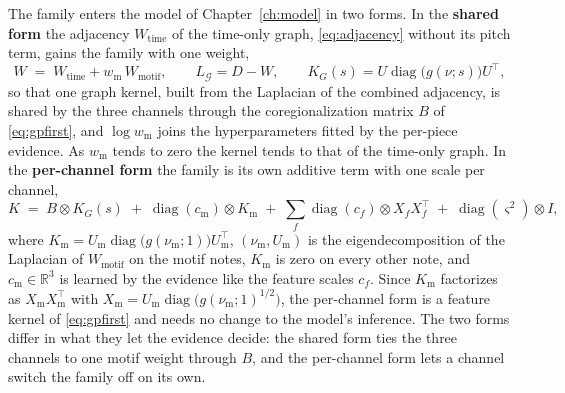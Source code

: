 \documentclass[11pt,a4paper]{report}
\newcommand{\R}{\mathbb{R}}
\newcommand{\graph}{\mathcal{G}}
\newcommand{\Lg}{L_{\graph}}
\newcommand{\diag}{\operatorname{diag}}
\begin{document}
The family enters the model of Chapter~\ref{ch:model} in two forms. In the
\textbf{shared form} the adjacency $W_{\mathrm{time}}$ of the time-only graph,
\eqref{eq:adjacency} without its pitch term, gains the family with one
weight,
\begin{equation}
  W \;=\; W_{\mathrm{time}} + w_{\mathrm m}\, W_{\mathrm{motif}},
  \qquad \Lg = D - W,
  \qquad K_G(s) = U \diag\bigl(g(\nu; s)\bigr) U^{\top},
  \label{eq:motif-shared}
\end{equation}
so that one graph kernel, built from the Laplacian of the combined
adjacency, is shared by the three channels through the coregionalization
matrix $B$ of \eqref{eq:gpfirst}, and $\log w_{\mathrm m}$ joins the
hyperparameters fitted by the per-piece evidence. As $w_{\mathrm m}$ tends
to zero the kernel tends to that of the time-only graph. In the
\textbf{per-channel form} the family is its own additive term with one
scale per channel,
\begin{equation}
  K \;=\; B \otimes K_G(s) \;+\; \diag(c_{\mathrm m}) \otimes K_{\mathrm m}
  \;+\; \sum_f \diag(c_f) \otimes X_f X_f^{\top}
  \;+\; \diag(\varsigma^2) \otimes I,
  \label{eq:motif-pc}
\end{equation}
where $K_{\mathrm m} = U_{\mathrm m} \diag\bigl(g(\nu_{\mathrm m}; 1)\bigr) U_{\mathrm m}^{\top}$,
$(\nu_{\mathrm m}, U_{\mathrm m})$ is the eigendecomposition of the
Laplacian of $W_{\mathrm{motif}}$ on the motif notes, $K_{\mathrm m}$ is zero
on every other note, and $c_{\mathrm m} \in \R^{3}$ is learned by the
evidence like the feature scales $c_f$. Since $K_{\mathrm m}$ factorizes as
$X_{\mathrm m} X_{\mathrm m}^{\top}$ with
$X_{\mathrm m} = U_{\mathrm m} \diag\bigl(g(\nu_{\mathrm m}; 1)^{1/2}\bigr)$, the per-channel form is a
feature kernel of \eqref{eq:gpfirst} and needs no change to the model's
inference. The two forms differ in what they let the evidence decide: the
shared form ties the three channels to one motif weight through $B$, and
the per-channel form lets a channel switch the family off on its own.
\end{document}
